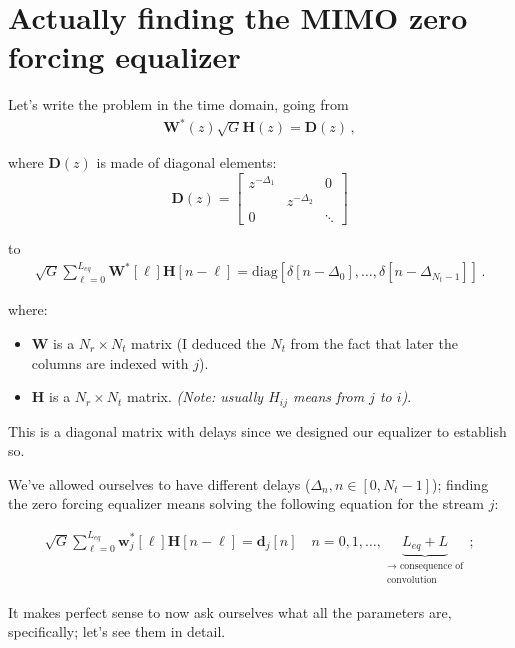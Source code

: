 \documentclass[a4paper, 12pt]{book}
\begin{document}
\section{Actually finding the MIMO zero forcing equalizer}

Let's write the problem in the time domain, going from
\begin{align}
    \mathbf{W}^*(z)\sqrt{G}\mathbf{H}(z) = \mathbf{D}(z) \,, \tag{2.130}
\end{align}

\noindent
where $\mathbf{D}(z)$ is made of diagonal elements:
\[
\mathbf{D}(z) = \begin{bmatrix}
z^{-\Delta_1} & & 0 \\
& z^{-\Delta_2} & \\
0 & & \ddots
\end{bmatrix}
\]

to
\begin{align}
    \sqrt{G} \sum_{\ell=0}^{L_{eq}} \mathbf{W}^*[\ell]\mathbf{H}[n-\ell] = \text{diag}[\delta[n-\Delta_0], \dots, \delta[n-\Delta_{N_t-1}]] \,. \tag{2.132}
\end{align}

where:
\begin{itemize}
    \item $\mathbf{W}$ is a $N_r \times N_t$ matrix (I deduced the $N_t$ from the fact that later the columns are indexed with $j$).
    \item $\mathbf{H}$ is a $N_r \times N_t$ matrix. \textit{(Note: usually $H_{ij}$ means from $j$ to $i$)}.
\end{itemize}

This is a diagonal matrix with delays since we designed our equalizer to establish so.

We've allowed ourselves to have different delays ($\Delta_n, n \in [0, N_t-1]$); finding the zero forcing equalizer means solving the following equation for the stream $j$:

\begin{align}
    \sqrt{G} \sum_{\ell=0}^{L_{eq}} \mathbf{w}_j^*[\ell]\mathbf{H}[n-\ell] = \mathbf{d}_j[n] \quad n=0, 1, \dots, \underbrace{L_{eq} + L}_{\substack{\rightarrow \text{ consequence of} \\ \text{convolution}}} \,; \tag{2.133}
\end{align}

It makes perfect sense to now ask ourselves what all the parameters are, specifically; let's see them in detail.
\end{document}
